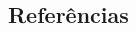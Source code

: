 \documentclass[a0,portrait]{a0poster}
\begin{document}
\begin{multicols}{2}

\vspace{-9mm}
\large
\color{NavyBlue}
\section*{Refer\^encias}
\renewcommand{\section}[2]{}
\color{Black}
\raggedright



\end{multicols}

\end{document}
